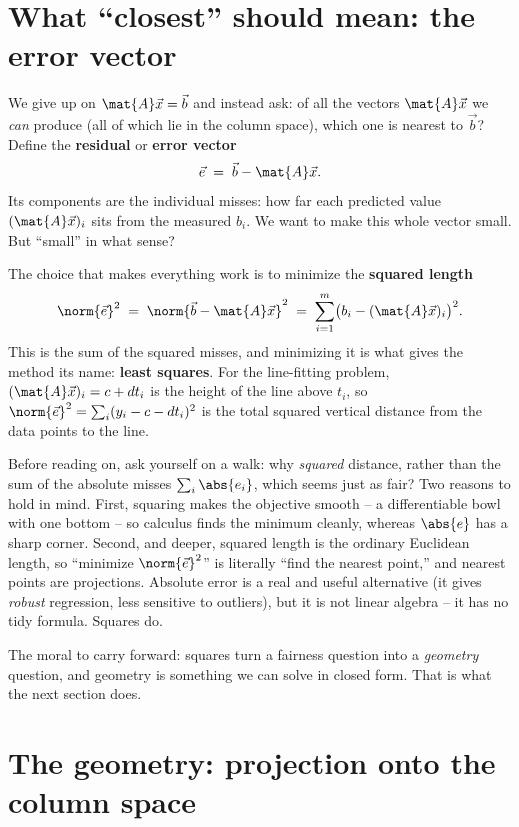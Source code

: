 \section{What ``closest'' should mean: the error vector}

We give up on $\mat{A}\vec{x}=\vec{b}$ and instead ask: of all the vectors $\mat{A}\vec{x}$ we
\emph{can} produce (all of which lie in the column space), which one is nearest to $\vec{b}$?
Define the \textbf{residual} or \textbf{error vector}
\[
  \vec{e} \;=\; \vec{b}-\mat{A}\vec{x}.
\]
Its components are the individual misses: how far each predicted value $(\mat{A}\vec{x})_i$ sits
from the measured $b_i$. We want to make this whole vector small. But ``small'' in what sense?

The choice that makes everything work is to minimize the \textbf{squared length}
\[
  \norm{\vec{e}}^2 \;=\; \norm{\vec{b}-\mat{A}\vec{x}}^2
  \;=\; \sum_{i=1}^{m} \bigl(b_i - (\mat{A}\vec{x})_i\bigr)^2 .
\]
This is the sum of the squared misses, and minimizing it is what gives the method its name:
\textbf{least squares}. For the line-fitting problem, $(\mat{A}\vec{x})_i = c+dt_i$ is the height
of the line above $t_i$, so $\norm{\vec{e}}^2 = \sum_i (y_i - c - d t_i)^2$ is the total squared
vertical distance from the data points to the line.

\begin{walkbox}
Before reading on, ask yourself on a walk: why \emph{squared} distance, rather than the sum of the
absolute misses $\sum_i \abs{e_i}$, which seems just as fair? Two reasons to hold in mind. First,
squaring makes the objective smooth -- a differentiable bowl with one bottom -- so calculus finds
the minimum cleanly, whereas $\abs{e}$ has a sharp corner. Second, and deeper, squared length is
the ordinary Euclidean length, so ``minimize $\norm{\vec{e}}^2$'' is literally ``find the nearest
point,'' and nearest points are projections. Absolute error is a real and useful alternative (it
gives \emph{robust} regression, less sensitive to outliers), but it is not linear algebra -- it has
no tidy formula. Squares do.
\end{walkbox}

The moral to carry forward: squares turn a fairness question into a \emph{geometry} question, and
geometry is something we can solve in closed form. That is what the next section does.

\section{The geometry: projection onto the column space}

